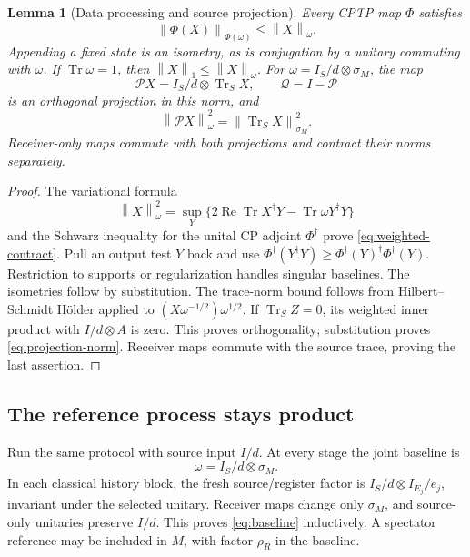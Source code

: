\documentclass[11pt]{article}
\numberwithin{equation}{section}
\newtheorem{lemma}[theorem]{Lemma}
\theoremstyle{remark}
\newcommand{\Tr}{\operatorname{Tr}}
\newcommand{\Pcal}{\mathcal P}
\newcommand{\Qcal}{\mathcal Q}
\newcommand{\norm}[1]{\left\lVert#1\right\rVert}
\begin{document}
\begin{lemma}[Data processing and source projection]
\label{lem:weighted}
Every CPTP map \(\Phi\) satisfies
\begin{equation}
 \norm{\Phi(X)}_{\Phi(\omega)}\le\norm{X}_{\omega}.
 \label{eq:weighted-contract}
\end{equation}
Appending a fixed state is an isometry, as is conjugation by a unitary
commuting with \(\omega\). If \(\Tr\omega=1\), then
\(\norm{X}_1\le\norm{X}_{\omega}\).
For \(\omega=I_S/d\otimes\sigma_M\), the map
\begin{equation}
 \Pcal X=I_S/d\otimes\Tr_SX,\qquad \Qcal=I-\Pcal
 \label{eq:projection}
\end{equation}
is an orthogonal projection in this norm, and
\begin{equation}
 \norm{\Pcal X}_{\omega}^2=\norm{\Tr_SX}_{\sigma_M}^2.
 \label{eq:projection-norm}
\end{equation}
Receiver-only maps commute with both projections and contract their norms
separately.
\end{lemma}
\begin{proof}
The variational formula
\[
 \norm{X}_{\omega}^2
 =\sup_Y\{2\operatorname{Re}\Tr X^\dagger Y
                 -\Tr\omega Y^\dagger Y\}
\]
and the Schwarz inequality for the unital CP adjoint \(\Phi^\dagger\) prove
\eqref{eq:weighted-contract}. Pull an output test \(Y\) back and use
\(\Phi^\dagger(Y^\dagger Y)\ge
\Phi^\dagger(Y)^\dagger\Phi^\dagger(Y)\).
Restriction to supports or regularization handles singular baselines.
The isometries follow by substitution. The trace-norm bound follows from
Hilbert--Schmidt H\"older applied to
\((X\omega^{-1/2})\omega^{1/2}\).
If \(\Tr_SZ=0\), its weighted inner product with \(I/d\otimes A\) is zero.
This proves orthogonality; substitution proves \eqref{eq:projection-norm}.
Receiver maps commute with the source trace, proving the last assertion.
\end{proof}

\subsection{The reference process stays product}
Run the same protocol with source input \(I/d\). At every stage the joint
baseline is
\begin{equation}
 \omega=I_S/d\otimes\sigma_M .
 \label{eq:baseline}
\end{equation}
In each classical history block, the fresh source/register factor is
\(I_S/d\otimes I_{E_j}/e_j\), invariant under the selected unitary. Receiver
maps change only \(\sigma_M\), and source-only unitaries preserve \(I/d\).
This proves \eqref{eq:baseline} inductively. A spectator reference may be
included in \(M\), with factor \(\rho_R\) in the baseline.
\end{document}
